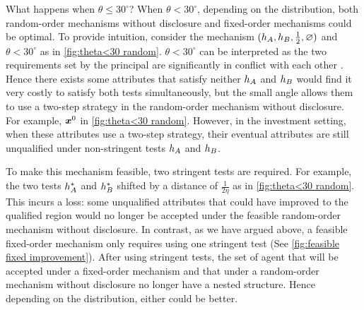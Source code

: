 
What happens when $\theta\leq 30^{\circ}$?
When $\theta< 30^{\circ}$, depending on the distribution, both random-order mechanisms without disclosure and fixed-order mechanisms could be optimal.
To provide intuition, consider the mechanism $(h_A,h_B,\frac12,\varnothing)$ and $\theta<30^{\circ}$ as in  \cref{fig:theta<30 random}.
$\theta<30^{\circ}$ can be interpreted as the two requirements set by the principal are significantly in conflict with each other .
Hence there exists some attributes that  satisfy neither $h_A$ and $h_B$ would find it very costly to satisfy both tests simultaneously, but the small angle allows them to use a two-step strategy in the random-order mechanism without disclosure.
For example, $\boldsymbol{x}^0$ in  \cref{fig:theta<30 random}.
However, in the investment setting, when these attributes use a two-step strategy, their eventual attributes are still unqualified under non-stringent tests $h_A$ and $h_B$.

To make this mechanism feasible, two stringent tests are required.
For example, the two tests $h_A^*$ and $h_B^*$ shifted by a distance of $\frac{1}{2\eta}$ as in \cref{fig:theta<30 random}.
This incurs a loss: some unqualified attributes that could have improved to the qualified region would no longer be accepted under the feasible random-order mechanism without disclosure.
In contrast, as we have argued above, a feasible fixed-order mechanism only requires using one stringent test (See \cref{fig:feasible fixed improvement}).
After using stringent tests, the set of agent that will be accepted under a fixed-order mechanism and that under a random-order mechanism without disclosure no longer have a nested structure.
Hence depending on the distribution, either could be better.



